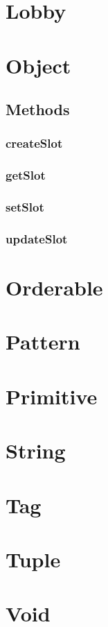 

\section{Lobby}
\section{Object}
\label{sec:std-object}

\subsection{Methods}

\subsubsection{createSlot}
\label{sec:std-object-createslot}

\subsubsection{getSlot}
\label{sec:std-object-getslot}

\subsubsection{setSlot}
\label{sec:std-object-setslot}

\subsubsection{updateSlot}
\label{sec:std-object-updateslot}

\section{Orderable}

\section{Pattern}
\section{Primitive}
\section{String}
\section{Tag}
\section{Tuple}
\section{Void}
\label{sec:std-void}


